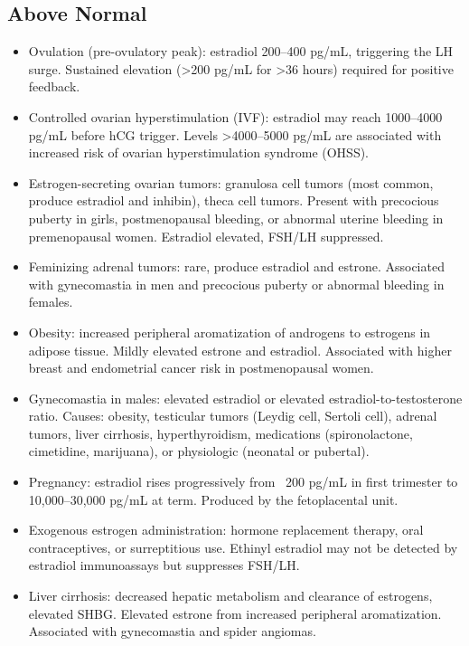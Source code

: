 \subsection*{Above Normal}
\begin{itemize}
  \item Ovulation (pre-ovulatory peak): estradiol 200--400 pg/mL, triggering the LH surge. Sustained elevation (>200 pg/mL for >36 hours) required for positive feedback.
  \item Controlled ovarian hyperstimulation (IVF): estradiol may reach 1000--4000 pg/mL before hCG trigger. Levels >4000--5000 pg/mL are associated with increased risk of ovarian hyperstimulation syndrome (OHSS).
  \item Estrogen-secreting ovarian tumors: granulosa cell tumors (most common, produce estradiol and inhibin), theca cell tumors. Present with precocious puberty in girls, postmenopausal bleeding, or abnormal uterine bleeding in premenopausal women. Estradiol elevated, FSH/LH suppressed.
  \item Feminizing adrenal tumors: rare, produce estradiol and estrone. Associated with gynecomastia in men and precocious puberty or abnormal bleeding in females.
  \item Obesity: increased peripheral aromatization of androgens to estrogens in adipose tissue. Mildly elevated estrone and estradiol. Associated with higher breast and endometrial cancer risk in postmenopausal women.
  \item Gynecomastia in males: elevated estradiol or elevated estradiol-to-testosterone ratio. Causes: obesity, testicular tumors (Leydig cell, Sertoli cell), adrenal tumors, liver cirrhosis, hyperthyroidism, medications (spironolactone, cimetidine, marijuana), or physiologic (neonatal or pubertal).
  \item Pregnancy: estradiol rises progressively from ~200 pg/mL in first trimester to 10,000--30,000 pg/mL at term. Produced by the fetoplacental unit.
  \item Exogenous estrogen administration: hormone replacement therapy, oral contraceptives, or surreptitious use. Ethinyl estradiol may not be detected by estradiol immunoassays but suppresses FSH/LH.
  \item Liver cirrhosis: decreased hepatic metabolism and clearance of estrogens, elevated SHBG. Elevated estrone from increased peripheral aromatization. Associated with gynecomastia and spider angiomas.
\end{itemize}

